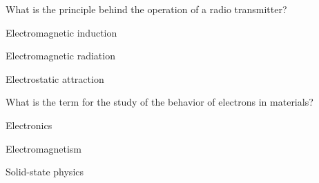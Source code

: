 \begin{enhancedmcq}{What is the principle behind the operation of a radio transmitter?}
\item Electromagnetic induction
\item Electromagnetic radiation
\item Electrostatic attraction

\end{enhancedmcq}
\begin{enhancedmcq}{What is the term for the study of the behavior of electrons in materials?}
\item Electronics
\item Electromagnetism
\item Solid-state physics
\end{enhancedmcq}